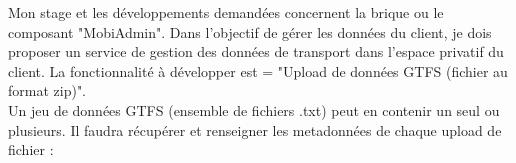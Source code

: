 Mon stage et les développements demandées concernent la brique ou le composant "MobiAdmin". Dans l'objectif de gérer les données du client, je dois proposer un service de gestion des données de transport dans l’espace privatif du client.
La fonctionnalité à développer est = "Upload de données GTFS (fichier au format zip)".\\ 
Un jeu de données GTFS (ensemble de fichiers .txt) peut en contenir un seul ou plusieurs. Il faudra récupérer et renseigner les metadonnées de chaque upload de fichier :

